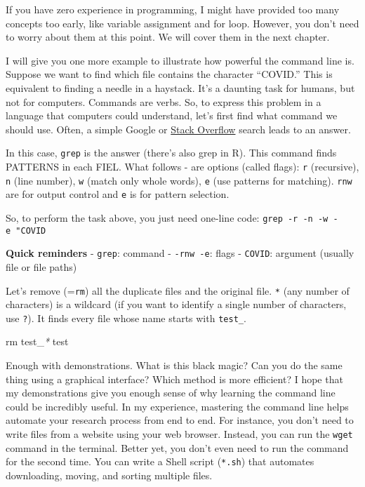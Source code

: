 \documentclass[
]{book}
\newenvironment{Shaded}{\begin{snugshade}}{\end{snugshade}}
\newcommand{\FunctionTok}[1]{\textcolor[rgb]{0.00,0.00,0.00}{#1}}
\newcommand{\NormalTok}[1]{#1}
\newcommand{\PreprocessorTok}[1]{\textcolor[rgb]{0.56,0.35,0.01}{\textit{#1}}}
\begin{document}
If you have zero experience in programming, I might have provided too many concepts too early, like variable assignment and for loop. However, you don't need to worry about them at this point. We will cover them in the next chapter.

I will give you one more example to illustrate how powerful the command line is. Suppose we want to find which file contains the character ``COVID.'' This is equivalent to finding a needle in a haystack. It's a daunting task for humans, but not for computers. Commands are verbs. So, to express this problem in a language that computers could understand, let's first find what command we should use. Often, a simple Google or \href{https://stackoverflow.com/}{Stack Overflow} search leads to an answer.

In this case, \texttt{grep} is the answer (there's also grep in R). This command finds PATTERNS in each FIEL. What follows - are options (called flags): \texttt{r} (recursive), \texttt{n} (line number), \texttt{w} (match only whole words), \texttt{e} (use patterns for matching). \texttt{rnw} are for output control and \texttt{e} is for pattern selection.

So, to perform the task above, you just need one-line code: \texttt{grep\ -r\ -n\ -w\ -e\ "COVID\textquotesingle{}\textquotesingle{}}

\textbf{Quick reminders}
- \texttt{grep}: command
- \texttt{-rnw\ -e}: flags
- \texttt{COVID}: argument (usually file or file paths)

Let's remove (=\texttt{rm}) all the duplicate files and the original file. \texttt{*} (any number of characters) is a wildcard (if you want to identify a single number of characters, use \texttt{?}). It finds every file whose name starts with \texttt{test\_}.

\begin{Shaded}
\begin{Highlighting}[]
\FunctionTok{rm}\NormalTok{ test\_}\PreprocessorTok{*}\NormalTok{ test }
\end{Highlighting}
\end{Shaded}

Enough with demonstrations. What is this black magic? Can you do the same thing using a graphical interface? Which method is more efficient? I hope that my demonstrations give you enough sense of why learning the command line could be incredibly useful. In my experience, mastering the command line helps automate your research process from end to end. For instance, you don't need to write files from a website using your web browser. Instead, you can run the \texttt{wget} command in the terminal. Better yet, you don't even need to run the command for the second time. You can write a Shell script (\texttt{*.sh}) that automates downloading, moving, and sorting multiple files.
\end{document}
